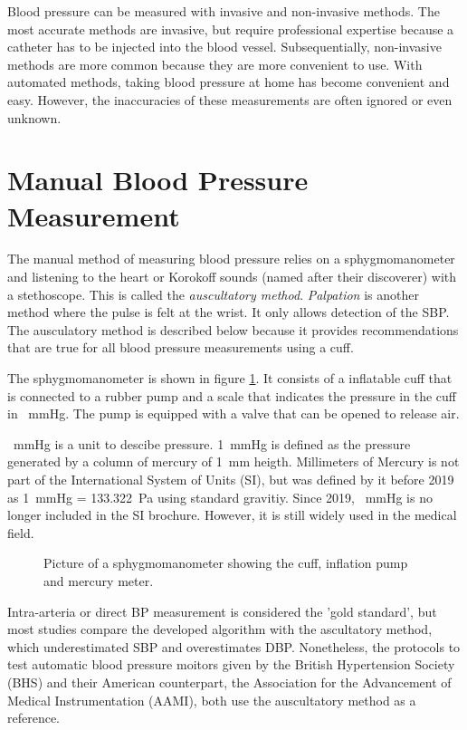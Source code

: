Blood pressure can be measured with invasive and non-invasive methods. The most accurate methods are invasive, but require professional expertise because a catheter has to be injected into the blood vessel. Subsequentially, non-invasive methods are more common because they are more convenient to use. With automated methods, taking blood pressure at home has become convenient and easy. However, the inaccuracies of these measurements are often ignored or even unknown.

\section{Manual Blood Pressure Measurement}
The manual method of measuring blood pressure relies on a sphygmomanometer and listening to the heart or Korokoff sounds (named after their discoverer) with a stethoscope. This is called the \emph{auscultatory method}. \emph{Palpation} is another method where the pulse is felt at the wrist. It only allows detection of the SBP. The ausculatory method is described below because it provides recommendations that are true for all blood pressure measurements using a cuff. 

The sphygmomanometer is shown in figure \ref{fig:sphy}. It consists of a inflatable cuff that is connected to a rubber pump and a scale that indicates the pressure in the cuff in \SI{}{\mmHg}. The pump is equipped with a valve that can be opened to release air.


\SI{}{\mmHg} is a unit to descibe pressure. \SI{1}{\mmHg} is defined as the pressure generated by a column of mercury of \SI{1}{\mm} heigth. Millimeters of Mercury is not part of the International System of Units (SI), but was defined by it before 2019 as \SI{1}{\mmHg} = \SI{133.322}{\Pa} using standard gravitiy.\cite{SI2008} Since 2019, \SI{}{\mmHg} is no longer included in the SI brochure. However, it is still widely used in the medical field.
 
 
\begin{figure}[h]
\centering
\caption{Picture of a sphygmomanometer showing the cuff, inflation pump and mercury meter.}
\label{fig:sphy}
\end{figure}

Intra-arteria or direct BP measurement is considered the 'gold standard', but most studies compare the developed algorithm with the ascultatory method, which underestimated SBP and overestimates DBP. \cite{Sapinski1996} Nonetheless, the protocols to test automatic blood pressure moitors given by the British Hypertension Society (BHS) and their American counterpart, the Association for the Advancement of Medical Instrumentation (AAMI), both use the auscultatory method as a reference. \cite{Jazbinsek2010,BHS,AAMI}
 
